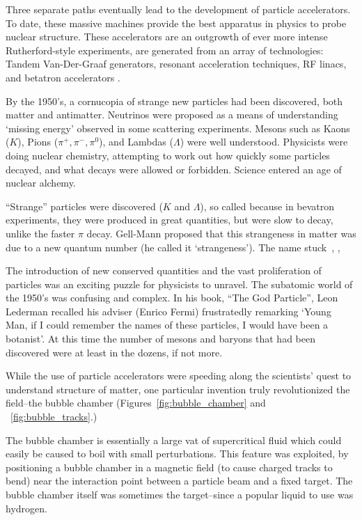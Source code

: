 Three separate paths eventually lead to the development of particle
accelerators. To date, these massive machines provide the best apparatus in
physics to probe nuclear structure. These accelerators are an outgrowth of ever
more intense Rutherford-style experiments, are generated from an array of
technologies: Tandem Van-Der-Graaf generators, resonant acceleration techniques,
RF linacs, and betatron accelerators \cite{Bryant1994}.

By the 1950's, a cornucopia of strange new particles had been discovered, both
matter and antimatter. Neutrinos were proposed as a means of understanding
`missing energy' observed in some scattering experiments. Mesons such as Kaons
($K$), Pions ($\pi^+,\pi^-,\pi^0$), and Lambdas ($\Lambda$) were well
understood.  Physicists were doing nuclear chemistry, attempting to work out how
quickly some particles decayed, and what decays were allowed or forbidden.
Science entered an age of nuclear alchemy.

``Strange'' particles were discovered ($K$ and $\Lambda$), so called because in
bevatron experiments, they were produced in great quantities, but were slow to
decay, unlike the faster $\pi$ decay. Gell-Mann proposed that this strangeness
in matter was due to a new quantum number (he called it `strangeness'). The name
stuck~\cite{Gell-Mann1953}, \cite{Gell-Mann1956}, \cite{Krauss2015}

The introduction of new conserved quantities and the vast proliferation of
particles was an exciting puzzle for physicists to unravel. The subatomic world
of the 1950's was confusing and complex. In his book, ``The God Particle'', Leon
Lederman recalled his adviser (Enrico Fermi) frustratedly remarking `Young Man,
if I could remember the names of these particles, I would have been a botanist'.
At this time the number of mesons and baryons that had been discovered were at
least in the dozens, if not more.

While the use of particle accelerators were speeding along the scientists' quest
to understand structure of matter, one particular invention truly revolutionized
the field--the bubble chamber (Figures~\ref{fig:bubble_chamber} and
~\ref{fig:bubble_tracks}.)

The bubble chamber is essentially a large vat of supercritical fluid which could
easily be caused to boil with small perturbations. This feature was exploited,
by positioning a bubble chamber in a magnetic field (to cause charged tracks to
bend) near the interaction point between a particle beam and a fixed target. The
bubble chamber itself was sometimes the target--since a popular liquid to use
was hydrogen. 

